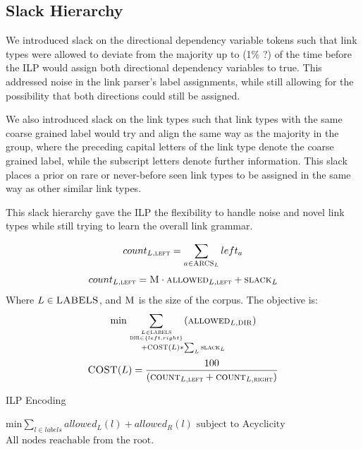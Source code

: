 \documentclass[11pt]{article}
\begin{document}
\subsection{Slack Hierarchy}

We introduced slack on the directional dependency variable tokens such that link types were allowed to deviate from the majority up to (1\% ?) of the time before the ILP would assign both directional dependency variables to true. This addressed noise in the link parser's label assignments, while still allowing for the possibility that both directions could still be assigned.

\todo{} We also introduced slack on the link types such that link types with the same coarse grained label would try and align the same way as the majority in the group, where the preceding capital letters of the link type denote the coarse grained label, while the subscript letters denote further information. This slack places a prior on rare or never-before seen link types to be assigned in the same way as other similar link types.

This slack hierarchy gave the ILP the flexibility to handle noise and novel link types while still trying to learn the overall link grammar.


\begin{equation}
  count_{L, \textsc{left}} = \sum_{a \in \textsc{ARCS}_L} left_a
\end{equation}
\begin{equation}
  count_{L, \textsc{left}} = \textsc{M} \cdot \textsc{allowed}_{L,\textsc{left}} + \textsc{slack}_{L}
\end{equation}
Where $L \in \textsc{LABELS}$, and $\textsc{M}$ is the size of the corpus.
The objective is:
\begin{equation}
  \min \sum_{L \in \textsc{LABELS} \atop \textsc{DIR} \in \{left, right\}} (\textsc{allowed}_{L,\textsc{DIR}}) \atop + \textsc{COST}(L) * \sum_L \textsc{slack}_L
\end{equation}
\begin{equation}
  \textsc{COST}(L) = \frac{100}{(\textsc{count}_{L,\textsc{left}} + \textsc{count}_{L,\textsc{right}})}
\end{equation}


\begin{algorithm}
\caption{ILP Encoding}\label{ILP}
\begin{algorithmic}[1]

\State $\text{min} \sum_{l \in labels} allowed_L(l) + allowed_R(l)$
\State $\text{subject to}$
\State $\text{Acyclicity}$
\State $\text{All nodes reachable from the root.}$
\end{algorithmic}
\end{algorithm}
\end{document}
